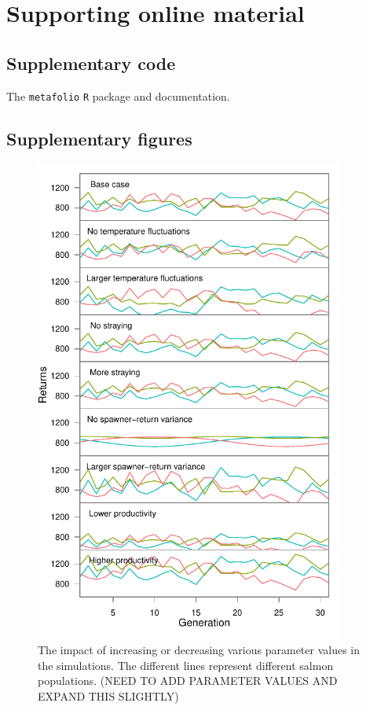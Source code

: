 \section{Supporting online material}

\subsection{Supplementary code}

The \texttt{metafolio} \texttt{R} package and documentation.

\subsection{Supplementary figures}

\begin{figure}[htbp]
\centering
\includegraphics[width=4.0in]{../examples/figure/plot-various-options-ts-3pops.pdf}
\caption{The impact of increasing or decreasing various parameter values in the simulations. The different lines represent different salmon populations. (NEED TO ADD PARAMETER VALUES AND EXPAND THIS SLIGHTLY)}
\label{f:eg-sens}
\end{figure}

